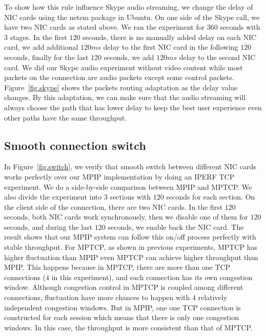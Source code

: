 To show how this rule influence Skype audio streaming, we change the delay of NIC cards using the netem package in Ubuntu. On one side of the Skype call, we have two NIC cards as stated above. We ran the experiment for $360$ seconds with $3$ stages. In the first $120$ seconds, there is no manually added delay on each NIC card, we add additional $120ms$ delay to the first NIC card in the following $120$ seconds, finally for the last $120$ seconds, we add $120ms$ delay to the second NIC card. We did our Skype audio experiment without video content while most packets on the connection are audio packets except some control packets. Figure~\ref{fig.skype} shows the packets routing adaptation as the delay value changes. By this adaptation, we can make sure that the audio streaming will always choose the path that has lower delay to keep the best user experience even other paths have the same throughput.


\subsection{Smooth connection switch}
\label{sec:switch}

In Figure~\ref{fig.switch}, we verify that smooth switch between different NIC cards works perfectly over our MPIP implementation by doing an IPERF TCP experiment. We do a side-by-side comparison between MPIP and MPTCP. We also divide the experiment into $3$ sections with $120$ seconds for each section. On the client side of the connection, there are two NIC cards. In the first $120$ seconds, both NIC cards work synchronously, then we disable one of them for $120$ seconds, and during the last $120$ seconds, we enable back the NIC card. The result shows that our MPIP system can follow this on/off process perfectly with stable throughput. For MPTCP, as shown in previous experiments, MPTCP has higher fluctuation than MPIP even MPTCP can achieve higher throughput than MPIP. This happens because in MPTCP, there are more than one TCP connections ($4$ in this experiment), and each connection has its own congestion window. Although congestion control in MPTCP is coupled among different connections, fluctuation have more chances to happen with $4$ relatively independent congestion windows. But in MPIP, one one TCP connection is constructed for each session which means that there is only one congestion windows. In this case, the throughput is more consistent than that of MPTCP.